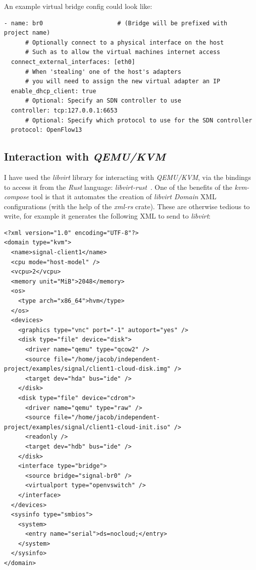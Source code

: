 \documentclass[
    author={Jacob Daniel Halsey},
    supervisor={Prof. Awais Rashid},
    degree={BSc},
    title={Building a Testbed for Evaluating Privacy Enhancing Technologies  (PETs)},
    subtitle={},
    type={software development},
    year={2021}
]{dissertation}
\begin{document}
An example virtual bridge config could look like:

\begin{verbatim}
- name: br0                     # (Bridge will be prefixed with project name)
      # Optionally connect to a physical interface on the host
      # Such as to allow the virtual machines internet access
  connect_external_interfaces: [eth0]
      # When 'stealing' one of the host's adapters 
      # you will need to assign the new virtual adapter an IP
  enable_dhcp_client: true
      # Optional: Specify an SDN controller to use
  controller: tcp:127.0.0.1:6653
      # Optional: Specify which protocol to use for the SDN controller
  protocol: OpenFlow13
\end{verbatim}

\subsection{Interaction with \emph{QEMU/KVM}}

I have used the \emph{libvirt} library for interacting with \emph{QEMU/KVM}, 
via the bindings to access it from the \emph{Rust} language: \emph{libvirt-rust}~\cite{libvirt_rust}.
One of the benefits of the \emph{kvm-compose} tool is that it automates the creation of \emph{libvirt Domain}
XML configurations (with the help of the \emph{xml-rs} crate). These are otherwise tedious to write, for 
example it generates the following XML to send to \emph{libvirt}:

\begin{verbatim}
<?xml version="1.0" encoding="UTF-8"?>
<domain type="kvm">
  <name>signal-client1</name>
  <cpu mode="host-model" />
  <vcpu>2</vcpu>
  <memory unit="MiB">2048</memory>
  <os>
    <type arch="x86_64">hvm</type>
  </os>
  <devices>
    <graphics type="vnc" port="-1" autoport="yes" />
    <disk type="file" device="disk">
      <driver name="qemu" type="qcow2" />
      <source file="/home/jacob/independent-project/examples/signal/client1-cloud-disk.img" />
      <target dev="hda" bus="ide" />
    </disk>
    <disk type="file" device="cdrom">
      <driver name="qemu" type="raw" />
      <source file="/home/jacob/independent-project/examples/signal/client1-cloud-init.iso" />
      <readonly />
      <target dev="hdb" bus="ide" />
    </disk>
    <interface type="bridge">
      <source bridge="signal-br0" />
      <virtualport type="openvswitch" />
    </interface>
  </devices>
  <sysinfo type="smbios">
    <system>
      <entry name="serial">ds=nocloud;</entry>
    </system>
  </sysinfo>
</domain>
\end{verbatim}
\end{document}
